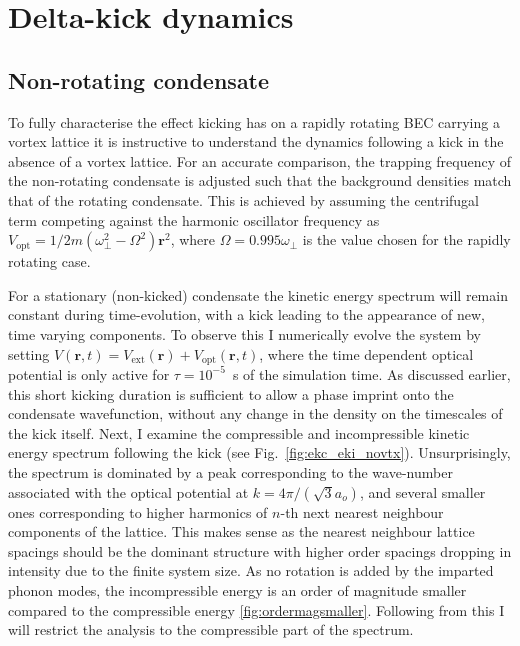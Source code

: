 \section{Delta-kick dynamics}\label{sec:kickvl}
\subsection{Non-rotating condensate}
To fully characterise the effect kicking has on a rapidly rotating BEC carrying a vortex lattice it is instructive to understand the dynamics following a kick in the absence of a vortex lattice. For an accurate comparison, the trapping frequency of the non-rotating condensate is adjusted such that the background densities match that of the rotating condensate. This is achieved by assuming the centrifugal term competing against the harmonic oscillator frequency as $V_{\text{opt}} = 1/2m(\omega^2_\perp - \Omega^2)\mathbf
{r}^2$, where $\Omega=0.995\omega_\perp$ is the value chosen for the rapidly rotating case.

For a stationary (non-kicked) condensate the kinetic energy spectrum will remain constant during time-evolution, with a kick leading to the appearance of new, time varying components. To observe this I numerically evolve the system by setting $V(\mathbf{r},t) = V_{\text{ext}}(\mathbf{r}) + V_{\text{opt}}(\mathbf{r},t)$, where the time dependent optical potential is only active for $\tau=10^{-5}$~s of the simulation time. As discussed earlier, this short kicking duration is sufficient to allow a phase imprint onto the condensate wavefunction, without any change in the density on the timescales of the kick itself. Next, I examine the compressible and incompressible kinetic energy spectrum following the kick (see Fig.~\ref{fig:ekc_eki_novtx}). Unsurprisingly, the spectrum is dominated by a peak corresponding to the wave-number associated with the optical potential at $k=4\pi/(\sqrt{3}a_o)$, and several smaller ones corresponding to higher harmonics of $n$-th next nearest neighbour components of the lattice. This makes sense as the nearest neighbour lattice spacings should be the dominant structure with higher order spacings dropping in intensity due to the finite system size. As no rotation is added by the imparted phonon modes, the incompressible energy is an order of magnitude smaller compared to the compressible energy \ref{fig:ordermagsmaller}. Following from this I will restrict the analysis to the compressible part of the spectrum.

